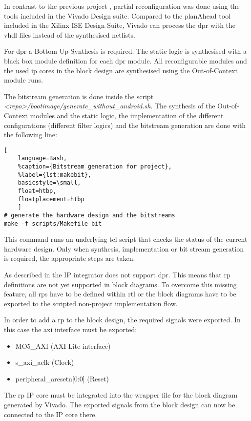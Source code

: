 In contrast to the previous project \cite{oldrepo}, partial reconfiguration was done using the tools included in the Vivado Design suite. Compared to the planAhead tool included in the Xilinx ISE Design Suite, Vivado can process the \gls{dpr} with the \gls{vhdl} files instead of the synthesised netlists.

For \gls{dpr} a Bottom-Up Synthesis is required. The static logic is synthesised with a black box module definition for each \gls{dpr} module. All reconfigurable modules and the used ip cores in the block design are synthesised using the Out-of-Context module runs.

The bitstream generation is done inside the script\\\emph{<repo>/bootimage/generate\_without\_android.sh}. The synthesis of the Out-of-Context modules and the static logic, the implementation of the different configurations (different filter logics) and the bitstream generation are done with the following line:

\begin{lstlisting}[
	language=Bash,
	%caption={Bitstream generation for project},
	%label={lst:makebit},
	basicstyle=\small,
	float=htbp,
	floatplacement=htbp
	]
# generate the hardware design and the bitstreams
make -f scripts/Makefile bit
\end{lstlisting}

This command runs an underlying \gls{tcl} script that checks the status of the current hardware design. Only when synthesis, implementation or bit stream generation is required, the appropriate steps are taken.

As described in \cite{UG909} the IP integrator does not support \gls{dpr}. This means that \gls{rp} definitions are not yet supported in block diagrams. To overcome this missing feature, all \glspl{rp} have to be defined within \gls{rtl} or the block diagrams have to be exported to the scripted non-project implementation flow. 

In order to add a \gls{rp} to the block design, the required signals were exported. In this case the \gls{axi} interface must be exported:
\begin{itemize}
    \item MO5\_AXI (AXI-Lite interface)
    \item s\_axi\_aclk (Clock)
    \item peripheral\_aresetn[0:0] (Reset)
\end{itemize}

The \gls{rp} IP core must be integrated into the wrapper file for the block diagram generated by Vivado. The exported signals from the block design can now be connected to the IP core there.


